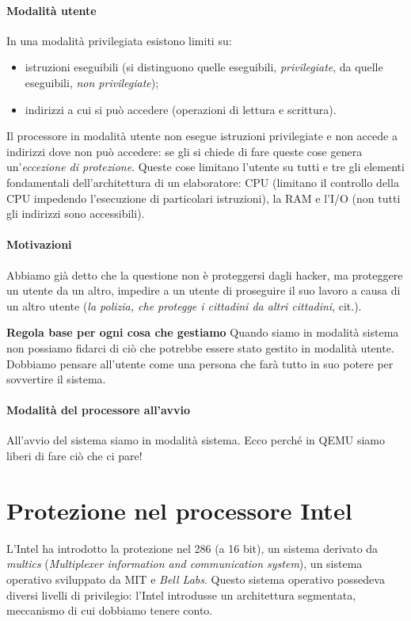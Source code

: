 \paragraph{Modalità utente} In una modalità privilegiata esistono limiti su:
\begin{itemize}
	\item istruzioni eseguibili (si distinguono quelle eseguibili, \emph{privilegiate}, da quelle eseguibili, \emph{non privilegiate});
	\item indirizzi a cui si può accedere (operazioni di lettura e scrittura).
\end{itemize}
Il processore in modalità utente non esegue istruzioni privilegiate e non accede a indirizzi dove non può accedere: se gli si chiede di fare queste cose genera un'\emph{eccezione di protezione}. Queste cose limitano l'utente su tutti e tre gli elementi fondamentali dell'architettura di un elaboratore: CPU (limitano il controllo della CPU impedendo l'esecuzione di particolari istruzioni), la RAM e l'I/O (non tutti gli indirizzi sono accessibili). 
\paragraph{Motivazioni} Abbiamo già detto che la questione non è proteggersi dagli hacker, ma proteggere un utente da un altro, impedire a un utente di proseguire il suo lavoro a causa di un altro utente (\emph{la polizia, che protegge i cittadini da altri cittadini}, cit.). 
\begin{framed}\noindent\textbf{Regola base per ogni cosa che gestiamo} Quando siamo in modalità sistema non possiamo fidarci di ciò che potrebbe essere stato gestito in modalità utente. Dobbiamo pensare all'utente come una persona che farà tutto in suo potere per sovvertire il sistema.
\end{framed}\paragraph{Modalità del processore all'avvio} All'avvio del sistema siamo in modalità sistema. Ecco perché in QEMU siamo liberi di fare ciò che ci pare! 
\section{Protezione nel processore Intel} L'Intel ha introdotto la protezione nel 286 (a 16 bit), un sistema derivato da \emph{multics} (\emph{Multiplexer information and communication system}), un sistema operativo sviluppato da MIT e \emph{Bell Labs}. Questo sistema operativo possedeva diversi livelli di privilegio: l'Intel introdusse un architettura segmentata, meccanismo di cui dobbiamo tenere conto.

